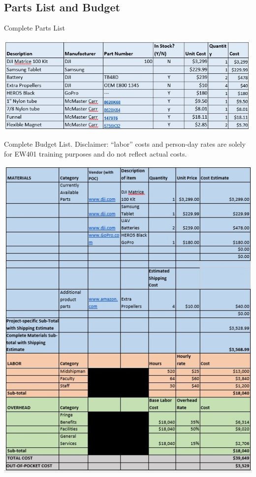 \documentclass{wrcecapstone}
\begin{document}
\subsection{Parts List and Budget}
\begin{table}
\caption{Complete Parts List}
\label{tab:7.2.1}
\begin{center}
\includegraphics[width=\columnwidth]{figures/table-721.jpg}
\end{center}
\end{table}
\begin{table}
\caption{Complete Budget List. Disclaimer: ``labor'' costs and person-day rates are solely for EW401 training purposes and do not reflect actual costs.}
\label{tab:7.2.2}
\begin{center}
\includegraphics[width=\columnwidth]{figures/table-722.jpg}
\end{center}
\end{table}
\end{document}
